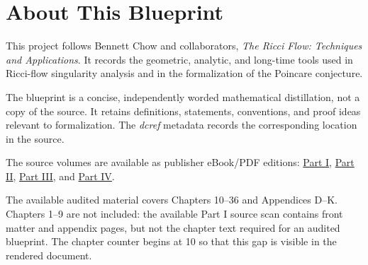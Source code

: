 

\chapter*{About This Blueprint}

This project follows Bennett Chow and collaborators, \emph{The Ricci Flow:
Techniques and Applications}.  It records the geometric, analytic, and
long-time tools used in Ricci-flow singularity analysis and in the
formalization of the Poincare conjecture.

The blueprint is a concise, independently worded mathematical distillation,
not a copy of the source.  It retains definitions, statements, conventions,
and proof ideas relevant to formalization.  The \emph{dcref} metadata records
the corresponding location in the source.

The source volumes are available as publisher eBook/PDF editions:
\href{https://bookstore.ams.org/surv-135/}{Part I},
\href{https://bookstore.ams.org/surv-144/}{Part II},
\href{https://bookstore.ams.org/surv-163/}{Part III}, and
\href{https://bookstore.ams.org/surv-206/}{Part IV}.

The available audited material covers Chapters 10--36 and Appendices D--K.
Chapters 1--9 are not included: the available Part I source scan contains
front matter and appendix pages, but not the chapter text required for an
audited blueprint.  The chapter counter begins at 10 so that this gap is
visible in the rendered document.




















